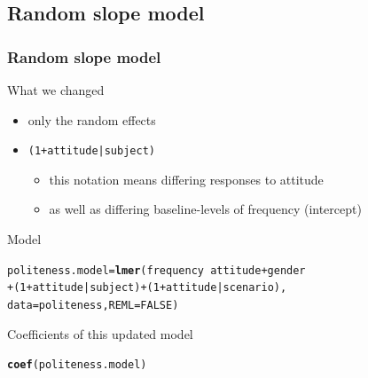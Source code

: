 \documentclass[10p]{beamer}\usepackage[]{graphicx}\usepackage[]{color}
\makeatletter
\newcommand{\hlnum}[1]{\textcolor[rgb]{0.686,0.059,0.569}{#1}}%
\newcommand{\hlopt}[1]{\textcolor[rgb]{0,0,0}{#1}}%
\newcommand{\hlstd}[1]{\textcolor[rgb]{0.345,0.345,0.345}{#1}}%
\newcommand{\hlkwb}[1]{\textcolor[rgb]{0.69,0.353,0.396}{#1}}%
\newcommand{\hlkwc}[1]{\textcolor[rgb]{0.333,0.667,0.333}{#1}}%
\newcommand{\hlkwd}[1]{\textcolor[rgb]{0.737,0.353,0.396}{\textbf{#1}}}%
\newenvironment{kframe}{%
 \def\at@end@of@kframe{}%
 \ifinner\ifhmode%
  \def\at@end@of@kframe{\end{minipage}}%
  \begin{minipage}{\columnwidth}%
 \fi\fi%
 \def\FrameCommand##1{\hskip\@totalleftmargin \hskip-\fboxsep
 \colorbox{shadecolor}{##1}\hskip-\fboxsep
     \hskip-\linewidth \hskip-\@totalleftmargin \hskip\columnwidth}%
 \MakeFramed {\advance\hsize-\width
   \@totalleftmargin\z@ \linewidth\hsize
   \@setminipage}}%
 {\par\unskip\endMakeFramed%
 \at@end@of@kframe}
\newenvironment{knitrout}{}{} %
\makeatother
\begin{document}
\subsection{Random slope model}
\begin{frame}[fragile]
\frametitle{Random slope model}
What we changed
\begin{itemize}
\item only the random effects
\item \texttt{(1+attitude|subject)}
  \begin{itemize}
  \item this notation means differing responses to attitude
  \item as well as differing baseline-levels of frequency (intercept)
  \end{itemize}
\end{itemize}
Model
\begin{knitrout}\scriptsize
{}\color{fgcolor}\begin{kframe}
\begin{alltt}
\hlstd{politeness.model} \hlkwb{=} \hlkwd{lmer}\hlstd{(frequency} \hlopt{~} \hlstd{attitude} \hlopt{+} \hlstd{gender}
                        \hlopt{+} \hlstd{(}\hlnum{1}\hlopt{+}\hlstd{attitude}\hlopt{|}\hlstd{subject)} \hlopt{+} \hlstd{(}\hlnum{1}\hlopt{+}\hlstd{attitude}\hlopt{|}\hlstd{scenario),}
                        \hlkwc{data}\hlstd{=politeness,} \hlkwc{REML}\hlstd{=}\hlnum{FALSE}\hlstd{)}
\end{alltt}
\end{kframe}
\end{knitrout}
Coefficients of this updated model
\begin{knitrout}\footnotesize
{}\color{fgcolor}\begin{kframe}
\begin{alltt}
\hlkwd{coef}\hlstd{(politeness.model)}
\end{alltt}
\end{kframe}
\end{knitrout}
\end{frame}
\end{document}

